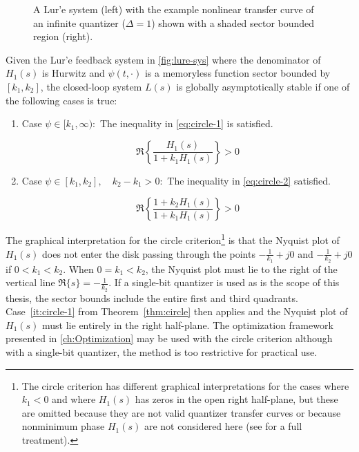 \begin{figure}
	\caption{A Lur'e system (left) with the example nonlinear transfer curve of an infinite quantizer ($\Delta=1$) shown with a shaded sector bounded region (right).} \label{fig:lure-sys}
\end{figure}

\begin{thm} \label{thm:circle}
	Given the Lur'e feedback system in \autoref{fig:lure-sys} where the denominator of $H_1(s)$ is Hurwitz and $\psi(t, \cdot)$ is a memoryless function sector bounded by $[k_1, k_2]$, the closed-loop system $L(s)$  is globally asymptotically stable if one of the following cases is true:
	
	\begin{enumerate}
		\item Case $\psi \in [k_1, \infty):$ The inequality in \autoref{eq:circle-1} is satisfied. \label{it:circle-1}
		
		\begin{equation}
			\Re\left\{\frac{H_1(s)}{1 + k_1H_1(s)}\right\} > 0 \label{eq:circle-1}
		\end{equation}
		
		\item Case $\psi \in [k_1, k_2], \quad k_2 - k_1 > 0:$ The inequality in \autoref{eq:circle-2} satisfied.
		
		\begin{equation}
			\Re\left\{\frac{1 + k_2H_1(s)}{1 + k_1H_1(s)}\right\} > 0 \label{eq:circle-2}
		\end{equation}
	\end{enumerate}
\end{thm}

The graphical interpretation for the circle criterion\footnote{The circle criterion has different graphical interpretations for the cases where $k_1 < 0$ and where $H_1(s)$ has zeros in the open right half-plane, but these are omitted because they are not valid quantizer transfer curves or because nonminimum phase $H_1(s)$ are not considered here (see \cite[Sec. 7.1.1]{Khalil2002} for a full treatment).} is that the Nyquist plot of $H_1(s)$ does not enter the disk passing through the points $-\frac{1}{k_1} + j0$ and $-\frac{1}{k_2} + j0$ if $0 < k_1 < k_2$. When $0 = k_1 < k_2$, the Nyquist plot must lie to the right of the vertical line $\Re\{s\} = -\frac{1}{k_2}$. If a single-bit quantizer is used as is the scope of this thesis, the sector bounds include the entire first and third quadrants. Case~\ref{it:circle-1} from Theorem~\ref{thm:circle} then applies and the Nyquist plot of $H_1(s)$ must lie entirely in the right half-plane. The optimization framework presented in \autoref{ch:Optimization} may be used with the circle criterion although with a single-bit quantizer, the method is too restrictive for practical use.

